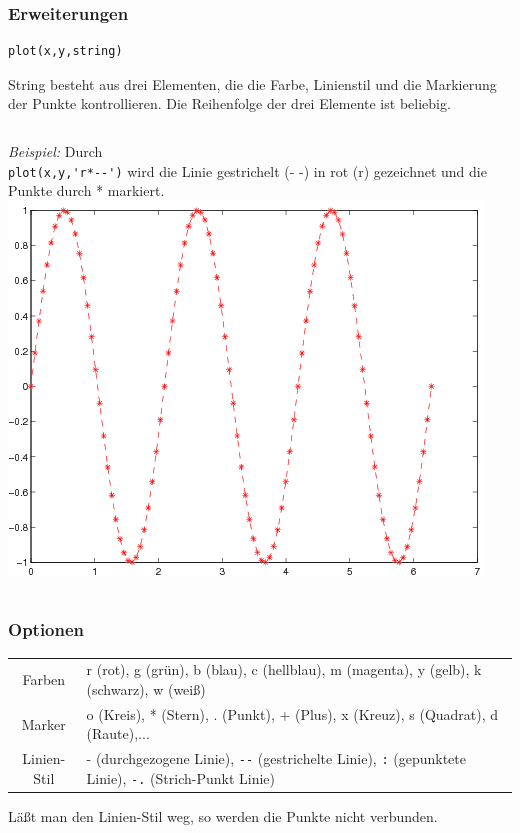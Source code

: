 \begin{frame}[fragile]\frametitle{Erweiterungen}
\begin{lstlisting}
plot(x,y,string)
\end{lstlisting}
\alert{String} besteht aus drei Elementen, die die Farbe, Linienstil
und die Markierung der Punkte kontrollieren. Die Reihenfolge der drei
Elemente ist beliebig.
\begin{columns}[c]
{\it Beispiel:} Durch \\
\alert{ \lstinline!plot(x,y,'r*--')!} wird die Linie
gestrichelt (- -) in rot (r) gezeichnet und die Punkte durch *
markiert.
\includegraphics[width=\textwidth]{./figures/grafik_2}
\end{columns}
\end{frame}
% 
% 
\begin{frame}[fragile]\frametitle{Optionen}
\begin{tabular}{cp{8.5cm}}
\alert{ Farben} & r (rot), g (grün), b (blau), c (hellblau), m (magenta),
  y (gelb), k (schwarz), w (weiß)\\
\alert{ Marker} & o (Kreis), * (Stern), . (Punkt), + (Plus), x (Kreuz), s
  (Quadrat), d (Raute),... \\
\alert{ Linien-Stil} &  - (durchgezogene Linie), \lstinline!--! (gestrichelte
  Linie), \lstinline!:! (gepunktete Linie), \lstinline!-.! (Strich-Punkt Linie)\\
\end{tabular}

Läßt man den Linien-Stil weg, so werden die Punkte nicht verbunden.
\end{frame}

